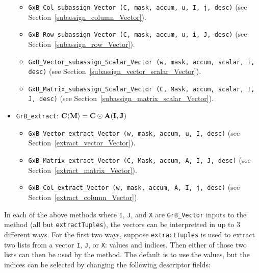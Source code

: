 \begin{itemize}
\begin{itemize}
    \item \verb'GxB_Col_subassign_Vector (C, mask, accum, u, I, j, desc)' \newline
    (see Section~\ref{subassign_column_Vector}).

    \item \verb'GxB_Row_subassign_Vector (C, mask, accum, u, i, J, desc)' \newline
    (see Section~\ref{subassign_row_Vector}).

    \item \verb'GxB_Vector_subassign_Scalar_Vector (w, mask, accum, scalar, I, desc)' \newline
    (see Section~\ref{subassign_vector_scalar_Vector}).

    \item \verb'GxB_Matrix_subassign_Scalar_Vector (C, Mask, accum, scalar, I, J, desc)' \newline
    (see Section~\ref{subassign_matrix_scalar_Vector}).

    \end{itemize}

\item \verb'GrB_extract': ${\bf C \langle M \rangle = C \odot A(I,J)}$

    \begin{itemize}

    \item \verb'GxB_Vector_extract_Vector (w, mask, accum, u, I, desc)' \newline
    (see Section~\ref{extract_vector_Vector}).

    \item \verb'GxB_Matrix_extract_Vector (C, Mask, accum, A, I, J, desc)' \newline
    (see Section~\ref{extract_matrix_Vector}).

    \item \verb'GxB_Col_extract_Vector (w, mask, accum, A, I, j, desc)' \newline
    (see Section~\ref{extract_column_Vector}).

    \end{itemize}

\end{itemize}

In each of the above methods where \verb'I', \verb'J', and \verb'X' are
\verb'GrB_Vector' inputs to the method (all but \verb'extractTuples'), the
vectors can be interpretted in up to 3 different ways.  For the first two ways,
suppose \verb'extractTuples' is used to extract two lists from a vector
\verb'I', \verb'J', or \verb'X': values and indices.  Then either of those two
lists can then be used by the method.  The default is to use the values,
but the indices can be selected by changing the following descriptor fields:

